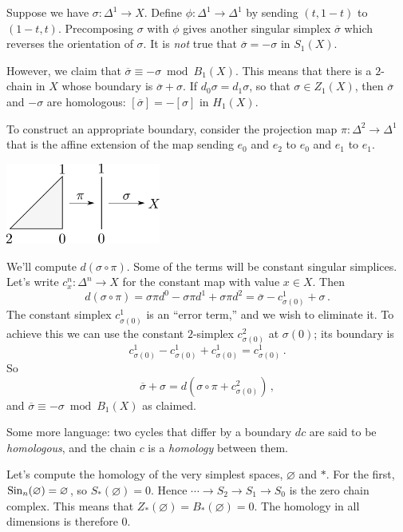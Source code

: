\begin{example} Suppose we have $\sigma\colon \Delta^1\to X$. Define $\phi\colon\Delta^1\to\Delta^1$ by sending $(t,1-t)$ to $(1-t,t)$. Precomposing $\sigma$ with $\phi$ gives another singular simplex $\overline{\sigma}$ which reverses the orientation of $\sigma$. It is \textit{not} true that $\overline{\sigma}=-\sigma$ in $S_1(X)$.

However, we claim that $\overline{\sigma}\equiv -\sigma\bmod B_1(X)$. This means that there is a $2$-chain in $X$ whose boundary is $\overline{\sigma}+\sigma$. If $d_0\sigma=d_1\sigma$, so that $\sigma\in Z_1(X)$, then $\overline{\sigma}$ and $-\sigma$ are homologous: $[\overline{\sigma}]=-[\sigma]$ in $ H_1(X)$.

To construct an appropriate boundary, consider the projection map 
$\pi:\Delta^2\to\Delta^1$ that is the affine extension of the map sending
$e_0$ and $e_2$ to $e_0$ and $e_1$ to $e_1$.  

\medskip
\begin{center}
\includegraphics[width=2in]{905/Figures/02-projection.pdf}
\end{center}

\medskip
We'll compute $d(\sigma\circ\pi)$. Some of the terms will be constant
singular simplices. Let's write $c_x^n:\Delta^n\to X$ for the constant map 
with value $x\in X$. Then
\[
d(\sigma\circ\pi)=\sigma\pi d^0-\sigma\pi d^1 +\sigma\pi d^2=\overline{\sigma}-c^1_{\sigma(0)}+\sigma\,.
\]
The constant simplex $c^1_{\sigma(0)}$ is an ``error term,'' and we wish to 
eliminate it. To achieve this we can use the constant $2$-simplex $c^2_{\sigma(0)}$ at $\sigma(0)$; its boundary is
\[
c^1_{\sigma(0)}-c^1_{\sigma(0)}+c^1_{\sigma(0)}=c^1_{\sigma(0)}\,.
\] 
So 
\[
\overline{\sigma}+\sigma=d(\sigma\circ\pi + c^2_{\sigma(0)})\,,
\] 
and $\overline{\sigma}\equiv -\sigma\bmod B_1(X)$ as claimed.

Some more language: two cycles that differ by a boundary $dc$ are said to be {\em homologous}, and the chain $c$ is a {\em homology} between them. 

\end{example}

Let's compute the homology of the very simplest spaces, $\varnothing$ and $\ast$. For the first, $\mathrm{Sin}_n(\varnothing)=\varnothing$, so $S_\ast(\varnothing)=0$. Hence $\cdots\to S_2\to S_1\to S_0$ is the zero chain complex. This means that $Z_\ast(\varnothing)=B_\ast(\varnothing)=0$. The homology in all dimensions is therefore $0$.

